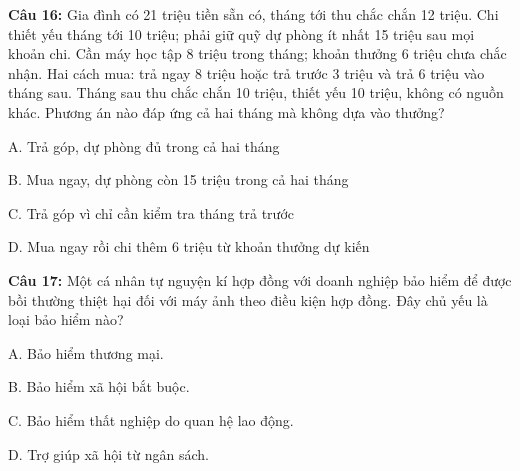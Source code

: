 \documentclass[12pt,a4paper]{article}
\begin{document}
\par\noindent\begin{minipage}{\linewidth}
\noindent\textbf{Câu 16:} Gia đình có 21 triệu tiền sẵn có, tháng tới thu chắc chắn 12 triệu. Chi thiết yếu tháng tới 10 triệu; phải giữ quỹ dự phòng ít nhất 15 triệu sau mọi khoản chi. Cần máy học tập 8 triệu trong tháng; khoản thưởng 6 triệu chưa chắc nhận. Hai cách mua: trả ngay 8 triệu hoặc trả trước 3 triệu và trả 6 triệu vào tháng sau. Tháng sau thu chắc chắn 10 triệu, thiết yếu 10 triệu, không có nguồn khác. Phương án nào đáp ứng cả hai tháng mà không dựa vào thưởng?\par
\noindent A. Trả góp, dự phòng đủ trong cả hai tháng\par
\noindent B. Mua ngay, dự phòng còn 15 triệu trong cả hai tháng\par
\noindent C. Trả góp vì chỉ cần kiểm tra tháng trả trước\par
\noindent D. Mua ngay rồi chi thêm 6 triệu từ khoản thưởng dự kiến\par
\end{minipage}\par\vspace{0.12cm}

\par\noindent\begin{minipage}{\linewidth}
\noindent\textbf{Câu 17:} Một cá nhân tự nguyện kí hợp đồng với doanh nghiệp bảo hiểm để được bồi thường thiệt hại đối với máy ảnh theo điều kiện hợp đồng. Đây chủ yếu là loại bảo hiểm nào?\par
\noindent A. Bảo hiểm thương mại.\par
\noindent B. Bảo hiểm xã hội bắt buộc.\par
\noindent C. Bảo hiểm thất nghiệp do quan hệ lao động.\par
\noindent D. Trợ giúp xã hội từ ngân sách.\par
\end{minipage}\par\vspace{0.12cm}
\end{document}
